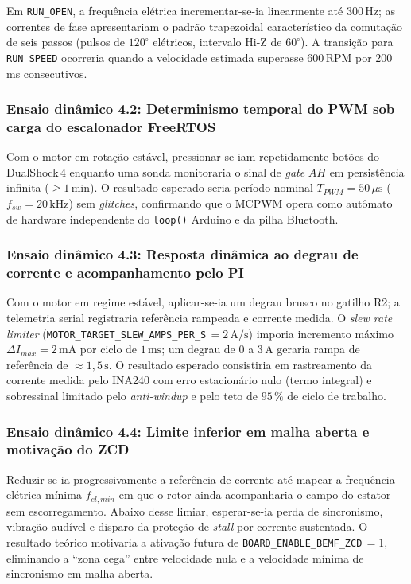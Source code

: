 Em \texttt{RUN\_OPEN}, a frequência elétrica incrementar-se-ia linearmente até $300\,\text{Hz}$; as correntes de fase apresentariam o padrão trapezoidal característico da comutação de seis passos (pulsos de $120^\circ$ elétricos, intervalo Hi-Z de $60^\circ$). A transição para \texttt{RUN\_SPEED} ocorreria quando a velocidade estimada superasse 600\,RPM por 200\,ms consecutivos.

\subsubsection{Ensaio dinâmico 4.2: Determinismo temporal do PWM sob carga do escalonador FreeRTOS}

Com o motor em rotação estável, pressionar-se-iam repetidamente botões do DualShock\,4 enquanto uma sonda monitoraria o sinal de \textit{gate} $AH$ em persistência infinita ($\geq 1\,\text{min}$). O resultado esperado seria período nominal $T_{PWM} = 50\,\mu\text{s}$ ($f_{sw} = 20\,\text{kHz}$) sem \textit{glitches}, confirmando que o MCPWM opera como autômato de hardware independente do \texttt{loop()} Arduino e da pilha Bluetooth.

\subsubsection{Ensaio dinâmico 4.3: Resposta dinâmica ao degrau de corrente e acompanhamento pelo PI}

Com o motor em regime estável, aplicar-se-ia um degrau brusco no gatilho R2; a telemetria serial registraria referência rampeada e corrente medida. O \textit{slew rate limiter} (\texttt{MOTOR\_TARGET\_SLEW\_AMPS\_PER\_S}\,$= 2\,\text{A/s}$) imporia incremento máximo $\Delta I_{max} = 2\,\text{mA}$ por ciclo de $1\,\text{ms}$; um degrau de $0$ a $3\,\text{A}$ geraria rampa de referência de $\approx 1{,}5\,\text{s}$. O resultado esperado consistiria em rastreamento da corrente medida pelo INA240 com erro estacionário nulo (termo integral) e sobressinal limitado pelo \textit{anti-windup} e pelo teto de $95\,\%$ de ciclo de trabalho.

\subsubsection{Ensaio dinâmico 4.4: Limite inferior em malha aberta e motivação do ZCD}

Reduzir-se-ia progressivamente a referência de corrente até mapear a frequência elétrica mínima $f_{el,min}$ em que o rotor ainda acompanharia o campo do estator sem escorregamento. Abaixo desse limiar, esperar-se-ia perda de sincronismo, vibração audível e disparo da proteção de \textit{stall} por corrente sustentada. O resultado teórico motivaria a ativação futura de \texttt{BOARD\_ENABLE\_BEMF\_ZCD}\,$= 1$, eliminando a ``zona cega'' entre velocidade nula e a velocidade mínima de sincronismo em malha aberta.

